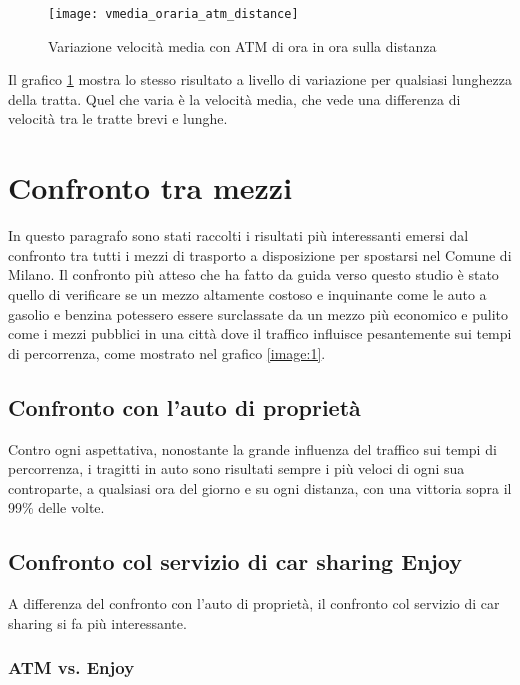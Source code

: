 \begin{figure}[H]
	\texttt{[image: vmedia\_oraria\_atm\_distance]}
	\caption{Variazione velocità media con ATM di ora in ora sulla distanza}
	\label{image:9}
\end{figure}

Il grafico \ref{image:9} mostra lo stesso risultato a livello di variazione per qualsiasi lunghezza della tratta. Quel che varia è la velocità media, che vede una differenza di velocità tra le tratte brevi e lunghe.

\section{Confronto tra mezzi}

In questo paragrafo sono stati raccolti i risultati più interessanti emersi dal confronto tra tutti i mezzi di trasporto a disposizione per spostarsi nel Comune di Milano. Il confronto più atteso che ha fatto da guida verso questo studio è stato quello di verificare se un mezzo altamente costoso e inquinante come le auto a gasolio e benzina potessero essere surclassate da un mezzo più economico e pulito come i mezzi pubblici in una città dove il traffico influisce pesantemente sui tempi di percorrenza, come mostrato nel grafico \ref{image:1}.

\subsection{Confronto con l'auto di proprietà}

Contro ogni aspettativa, nonostante la grande influenza del traffico sui tempi di percorrenza, i tragitti in auto sono risultati sempre i più veloci di ogni sua controparte, a qualsiasi ora del giorno e su ogni distanza, con una vittoria sopra il 99\% delle volte.

\subsection{Confronto col servizio di car sharing Enjoy}

A differenza del confronto con l'auto di proprietà, il confronto col servizio di car sharing si fa più interessante.

\subsubsection{ATM vs. Enjoy}

